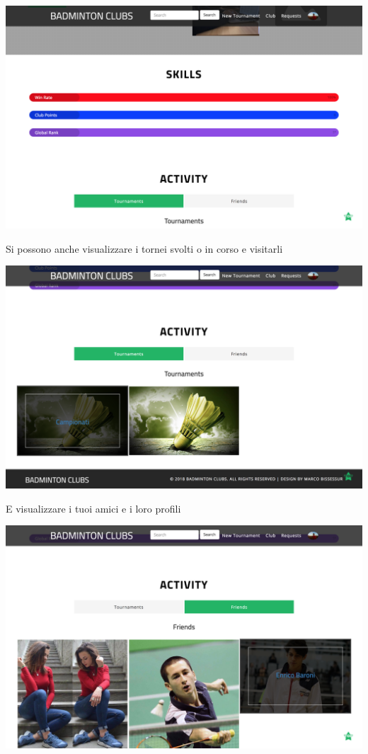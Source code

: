 \documentclass{article}
\begin{document}
\begin{center}
    \includegraphics[width=16cm]{UX/mypskills}
\end{center}
Si possono anche visualizzare i tornei svolti o in corso e visitarli
\begin{center}
    \includegraphics[width=16cm]{UX/myptour}
\end{center}
E visualizzare i tuoi amici e i loro profili
\begin{center}
    \includegraphics[width=16cm]{UX/mypfriendsl}
\end{center}
\end{document}
